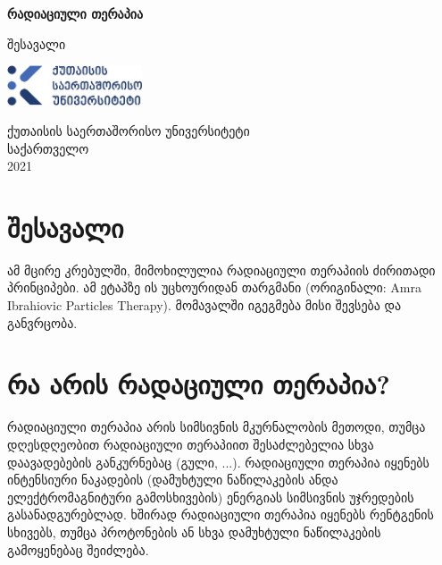 \documentclass[12pt,a4paper,]{report}
\begin{document}
\begin{titlepage}
   \begin{center}
       \vspace*{1cm}

       \textbf{რადიაციული თერაპია}

       \vspace{0.5cm}
        შესავალი
            
       \vspace{1.5cm}

       \textbf{}

       \vfill
            
            
       \vspace{0.8cm}
     
       \includegraphics[width=0.3\textwidth]{images/kiu_logo}
            
       ქუთაისის საერთაშორისო უნივერსიტეტი\\
       საქართველო\\
       2021
            
   \end{center}
\end{titlepage}


\chapter{შესავალი}
ამ მცირე კრებულში, მიმოხილულია რადიაციული თერაპიის ძირითადი პრინციპები. ამ ეტაპზე ის უცხოურიდან თარგმანი (ორიგინალი: Amra Ibrahiovic Particles Therapy). მომავალში იგეგმება მისი შევსება და განვრცობა.

\pagebreak

\chapter{რა არის რადაციული თერაპია?}
რადიაციული თერაპია არის სიმსივნის მკურნალობის მეთოდი, თუმცა დღესდღეობით რადიაციული თერაპიით შესაძლებელია სხვა დაავადებების განკურნებაც (გული, ...). რადიაციული თერაპია იყენებს ინტენსიური ნაკადების (დამუხტული ნაწილაკების ანდა ელექტრომაგნიტური გამოსხივების) ენერგიას სიმსივნის უჯრედების გასანადგურებლად. ხშირად რადიაციული თერაპია იყენებს რენტგენის სხივებს, თუმცა პროტონების ან სხვა დამუხტული ნაწილაკების გამოყენებაც შეიძლება.
\end{document}
